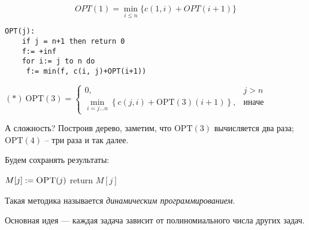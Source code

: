 \[
    OPT(1) = \min\limits_{i\leqslant n}\{c(1, i)+OPT(i+1)\}
\]

\begin{lstlisting}
OPT(j):
    if j = n+1 then return 0
    f:= +inf
    for i:= j to n do
     f:= min(f, c(i, j)+OPT(i+1))
\end{lstlisting}

$(*)\ \mathrm{OPT}(3) =\begin{cases}
    0, & j>n\\
    \min\limits_{i = j\ldots n}\left\{ c(j, i) + \mathrm{OPT}(3)(i+1) \right\}, & \text{иначе}
\end{cases}$

А сложность? Построив дерево, заметим, что $\mathrm{OPT}(3)$ вычисляется два раза; $\mathrm{OPT}(4)$ -- три раза и так далее.

Будем сохранять результаты:

\begin{algorithmic}
	\Else
		\State \(M[j] \mathrel{:=} \textsc{OPT}(j)\)
	\EndIf
	\State return \(M[j]\)
	\EndFunction
\end{algorithmic}

Такая методика называется \emph{динамическим программированием}.

Основная идея --- каждая задача зависит от полиномиального числа других задач.


